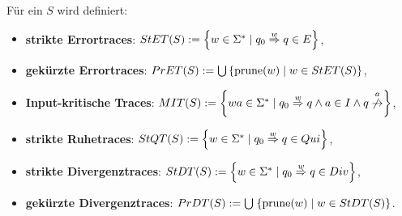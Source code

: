 \begin{frame}
  \begin{Def}[Traces]
    Für ein \EIO{} $S$ wird definiert:
    \begin{itemize}
      \item \textbf{strikte Errortraces}: $StET{}(S):=\left\{w\in\Sigma
        ^*\mid q_0\overset{w}{\Rightarrow}q\in E\right\}$,
      \item \textbf{gekürzte Errortraces}: $PrET{}(S):=\bigcup\left\{\mathrm{prune}{}(w)\mid w\in
        StET{}(S)\right\}$,
      \item \textbf{Input-kritische Traces}: $\MIT{}(S):=\left\{wa\in\Sigma ^*\mid
        q_0\overset{w}{\Rightarrow}q\wedge a\in I\wedge
      q\overset{a}{\not{\hspace{-0.1cm}\rightarrow}}\right\}$,
      \item<2-> \textbf{strikte Ruhetraces}: $StQT{}(S) := \left\{w\in\Sigma ^*\mid q_0
        \overset{w}{\Rightarrow} q\in Qui\right\}$,
      \item<3-> \textbf{strikte Divergenztraces}: $StDT{}(S) := \left\{w\in\Sigma
          ^*\mid
        q_0 \overset{w}{\Rightarrow} q\in Div\right\}$,
      \item<3-> \textbf{gekürzte Divergenztraces}: $PrDT{}(S) :=
        \bigcup\hspace{1pt}\left\{\mathrm{prune}{}(w)\mid w\in StDT{}(S)\right\}$.
    \end{itemize}
  \end{Def}
\end{frame}

